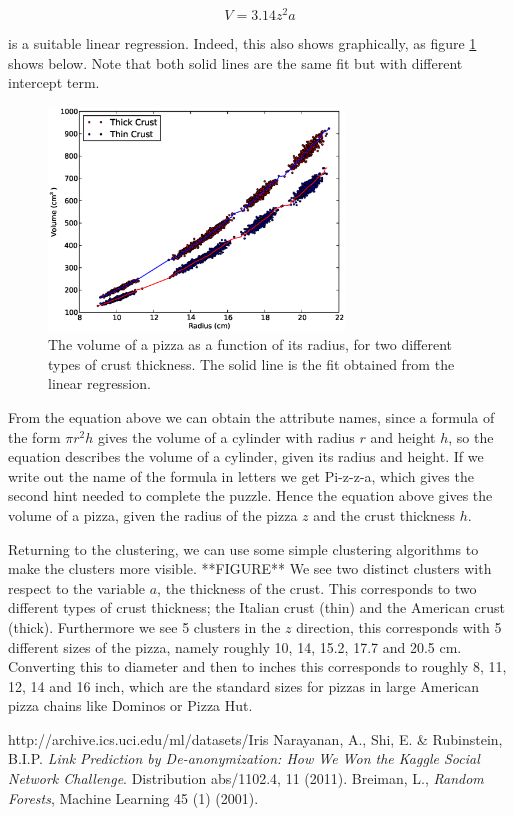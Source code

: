 \documentclass[a4]{article}
\begin{document}
\begin{equation*}
  V = 3.14z^2a
\end{equation*}

is a suitable linear regression. Indeed, this also shows graphically, as figure \ref{fig:pizza} shows below. Note that both solid lines are the same fit but with different intercept term.

\begin{figure}[H]
  \centering
  \includegraphics[width=0.7\textwidth]{pizza.eps}
  \caption{The volume of a pizza as a function of its radius, for two different types of crust thickness. The solid line is the fit obtained from the linear regression.}
  \label{fig:pizza}
\end{figure}

From the equation above we can obtain the attribute names, since a formula of the form $\pi r^2h$ gives the volume of a cylinder with radius $r$ and height $h$, so the equation describes the volume of a cylinder, given its radius and height. If we write out the name of the formula in letters we get Pi-z-z-a, which gives the second hint needed to complete the puzzle. Hence the equation above gives the volume of a pizza, given the radius of the pizza $z$ and the crust thickness $h$. 

Returning to the clustering, we can use some simple clustering algorithms to make the clusters more visible. **FIGURE** We see two distinct clusters with respect to the variable $a$, the thickness of the crust. This corresponds to two different types of crust thickness; the Italian crust (thin) and the American crust (thick). Furthermore we see 5 clusters in the $z$ direction, this corresponds with 5 different sizes of the pizza, namely roughly 10, 14, 15.2, 17.7 and 20.5 cm. Converting this to diameter and then to inches this corresponds to roughly 8, 11, 12, 14 and 16 inch, which are the standard sizes for pizzas in large American pizza chains like Dominos or Pizza Hut.

\begin{thebibliography}{7}
  http://archive.ics.uci.edu/ml/datasets/Iris
  Narayanan, A., Shi, E. \& Rubinstein, B.I.P. \emph{Link Prediction by De-anonymization: How We Won the Kaggle Social Network Challenge}. Distribution abs/1102.4, 11 (2011).
  Breiman, L., \emph{Random Forests}, Machine Learning 45 (1) (2001).
\end{thebibliography}
\end{document}
